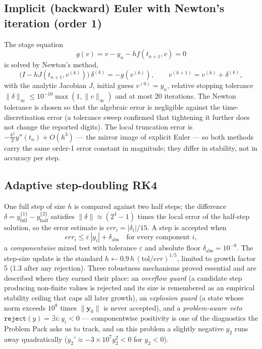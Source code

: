 ﻿\documentclass[11pt,a4paper]{article}
\newcommand{\yy}{\mathbf{y}}
\begin{document}
\subsection{Implicit (backward) Euler with Newton's iteration (order 1)}
The stage equation
\begin{equation}
g(v)=v-y_n-hf(t_{n+1},v)=0
\end{equation}
is solved by Newton's method,
\begin{equation}
\bigl(I-hJ(t_{n+1},v^{(k)})\bigr)\,\delta^{(k)}=-g(v^{(k)}),\qquad
v^{(k+1)}=v^{(k)}+\delta^{(k)},
\end{equation}
with the analytic Jacobian $J$, initial guess $v^{(0)}=y_n$, relative stopping
tolerance $\|\delta\|_\infty\le10^{-10}\max(1,\|v\|_\infty)$ and at most 20
iterations.  The Newton tolerance is chosen so that the algebraic error is
negligible against the time-discretisation error (a tolerance sweep confirmed
that tightening it further does not change the reported digits).  The local
truncation error is $-\tfrac{h^2}{2}y''(t_n)+O(h^3)$ --- the mirror image of
explicit Euler --- so both methods carry the same order-1 error constant in
magnitude; they differ in stability, not in accuracy per step.

\subsection{Adaptive step-doubling RK4}\label{sec:adaptmeth}
One full step of size $h$ is compared against two half steps; the difference
$\delta = y^{\{1\}}_{\text{full}}-y^{\{2\}}_{\text{half}}$ satisfies
$\|\delta\|\approx(2^4-1)$ times the local error of the half-step solution, so
the error estimate is $err_i=|\delta_i|/15$.  A step is accepted when
\begin{equation}\label{eq:tol}
err_i \le \varepsilon\,|y_i| + \delta_{\mathrm{abs}}\quad\text{for every component }i,
\end{equation}
a \emph{componentwise} mixed test with tolerance $\varepsilon$ and absolute
floor $\delta_{\mathrm{abs}}=10^{-9}$.  The step-size update is the standard
$h\leftarrow0.9\,h\,(\text{tol}/err)^{1/5}$, limited to growth factor 5 (1.3
after any rejection).  Three robustness mechanisms proved essential and are
described where they earned their place:
an \emph{overflow guard} (a candidate step producing non-finite values is
rejected and its size is remembered as an empirical stability ceiling that
caps all later growth), an \emph{explosion guard} (a state whose norm exceeds
$10^8$ times $\|\yy_0\|$ is never accepted), and a \emph{problem-aware veto}
$\texttt{reject}(y)=\exists i: y_i<0$ --- componentwise positivity is one of
the diagnostics the Problem Pack asks us to track, and on this problem a
slightly negative $y_2$ runs away quadratically ($y_2'\approx-3\times10^7
y_2^2<0$ for $y_2<0$).
\end{document}
